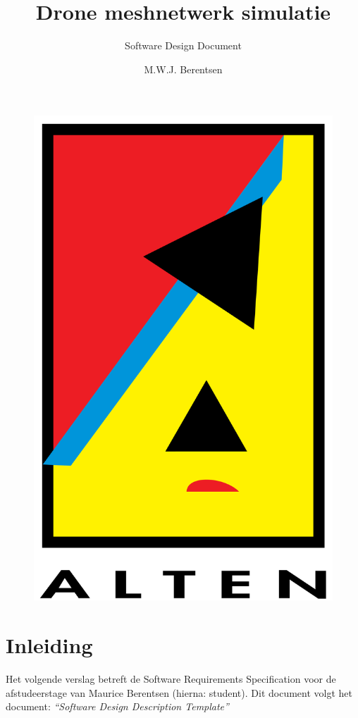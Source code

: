 \documentclass[a4paper, 11pt, oneside]{report}
\author{M.W.J. Berentsen}
\title{\myfont Drone meshnetwerk simulatie}
\subtitle{Software Design Document}{Versie 2.0}{Alten Nederland B.V.}{Hogeschool van Arnhem en Nijmegen}{HBO Technische Informatica - Embedded Software Developement }{MWJ.Berentsen@student.han.nl}{Studentnummer: 561399}{Docent: J. Visch, MSc}{Assessor: ir. C.G.R. van Uffelen}
\begin{document}
\begin{figure}
	\begin{center}\includegraphics[scale=0.1]{Afbeeldingen/alten.png}\end{center}
\end{figure}
\maketitle

\tableofcontents
\clearpage




\chapter{Inleiding}
\label{inleiding}
Het volgende verslag betreft de Software Requirements Specification voor de afstudeerstage van Maurice Berentsen (hierna: student).
Dit document volgt het document: \textit{``Software Design Description Template''} \cite{template:sdd}
\end{document}
